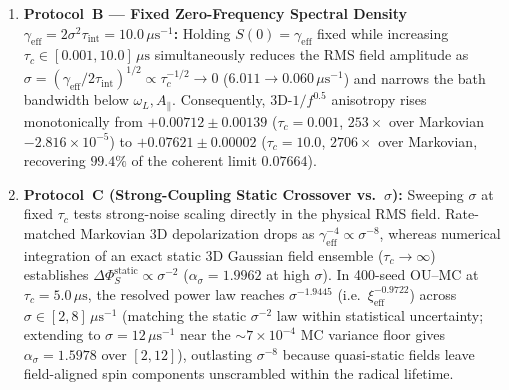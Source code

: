 \documentclass[twocolumn,10pt,amsmath,amssymb,floatfix]{revtex4-2}
\theoremstyle{plain}
\theoremstyle{definition}
\newcommand{\DeltaPhi}{\Delta\Phi_S}
\begin{document}
\begin{enumerate}[leftmargin=1.4em,itemsep=2pt]
\begin{itemize}[leftmargin=1.2em,itemsep=1pt]
  \end{itemize}
Under uniaxial $S_{1z}$ colored noise, $\DeltaPhi$ sits stably across $+0.063$--$0.075$ for all $\tau_c \in [0.001, 30]\,\mu\text{s}$, consistent with its $O(\xi^0)$ dark manifold.
\item \textbf{Protocol~B --- Fixed Zero-Frequency Spectral Density $\gamma_{\mathrm{eff}} = 2\sigma^2\tau_{\mathrm{int}} = 10.0\,\mu\text{s}^{-1}$:} Holding $S(0) = \gamma_{\mathrm{eff}}$ fixed while increasing $\tau_c \in [0.001, 10.0]\,\mu\text{s}$ simultaneously reduces the RMS field amplitude as $\sigma = (\gamma_{\mathrm{eff}} / 2\tau_{\mathrm{int}})^{1/2} \propto \tau_c^{-1/2} \to 0$ ($6.011 \to 0.060\,\mu\text{s}^{-1}$) and narrows the bath bandwidth below $\omega_L, A_\parallel$. Consequently, 3D-$1/f^{0.5}$ anisotropy rises monotonically from $+0.00712 \pm 0.00139$ ($\tau_c=0.001$, $253\times$ over Markovian $-2.816\times 10^{-5}$) to $+0.07621 \pm 0.00002$ ($\tau_c=10.0$, $2706\times$ over Markovian, recovering $99.4\%$ of the coherent limit $0.07664$).
\item \textbf{Protocol~C (Strong-Coupling Static Crossover vs.\ $\sigma$):} Sweeping $\sigma$ at fixed $\tau_c$ tests strong-noise scaling directly in the physical RMS field. Rate-matched Markovian 3D depolarization drops as $\gamma_{\mathrm{eff}}^{-4} \propto \sigma^{-8}$, whereas numerical integration of an exact static 3D Gaussian field ensemble ($\tau_c \to \infty$) establishes $\DeltaPhi^{\mathrm{static}} \propto \sigma^{-2}$ ($\alpha_\sigma = 1.9962$ at high $\sigma$). In 400-seed OU--MC at $\tau_c = 5.0\,\mu\text{s}$, the resolved power law reaches $\sigma^{-1.9445}$ (i.e.\ $\xi_{\mathrm{eff}}^{-0.9722}$) across $\sigma \in [2, 8]\,\mu\text{s}^{-1}$ (matching the static $\sigma^{-2}$ law within statistical uncertainty; extending to $\sigma=12\,\mu\text{s}^{-1}$ near the $\sim 7\times 10^{-4}$ MC variance floor gives $\alpha_\sigma = 1.5978$ over $[2,12]$), outlasting $\sigma^{-8}$ because quasi-static fields leave field-aligned spin components unscrambled within the radical lifetime.
\end{enumerate}
\end{document}
